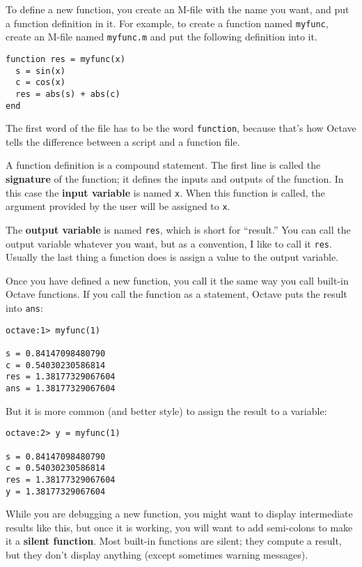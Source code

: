 To define a new function, you create an M-file with the name you
want, and put a function definition in it. For example, to create
a function named {\tt myfunc}, create an M-file named {\tt myfunc.m}
and put the following definition into it.

\begin{verbatim}
function res = myfunc(x)
  s = sin(x)
  c = cos(x)
  res = abs(s) + abs(c)
end
\end{verbatim}

The first word of the file has to be the word {\tt function}, because
that's how Octave tells the difference between a script and a function
file.

A function definition is a compound statement. The first line
is called the {\bf signature} of the function; it defines
the inputs and outputs of the function. In this case the {\bf input
variable} is named {\tt x}. When this function is called, the
argument provided by the user will be assigned to {\tt x}.

The {\bf output variable} is named {\tt res}, which is short for
``result.'' You can call the output variable whatever you want, but
as a convention, I like to call it {\tt res}. Usually the last
thing a function does is assign a value to the output variable.

Once you have defined a new function, you call it the same way you
call built-in Octave functions. If you call the function as a statement,
Octave puts the result into {\tt ans}:

\begin{verbatim}
octave:1> myfunc(1)

s = 0.84147098480790
c = 0.54030230586814
res = 1.38177329067604
ans = 1.38177329067604
\end{verbatim}

But it is more common (and better style) to assign the result to
a variable:

\begin{verbatim}
octave:2> y = myfunc(1)

s = 0.84147098480790
c = 0.54030230586814
res = 1.38177329067604
y = 1.38177329067604
\end{verbatim}

While you are debugging a new function, you might want to display
intermediate results like this, but once it is working, you will want
to add semi-colons to make it a {\bf silent function}. Most built-in
functions are silent; they compute a result, but they don't display
anything (except sometimes warning messages).

